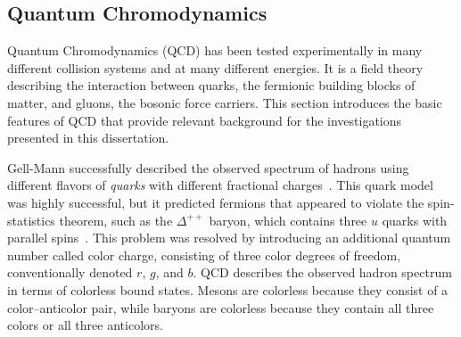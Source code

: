 \subsection{Quantum Chromodynamics}
\label{sec:qcd}


Quantum Chromodynamics (QCD) has been tested experimentally in many different collision systems and at many different energies. It is a field theory describing the interaction between quarks, the fermionic building blocks of matter, and gluons, the bosonic force carriers.
This section introduces the basic features of QCD that provide relevant background for the investigations presented in this dissertation.

Gell-Mann successfully described the observed spectrum of hadrons using different flavors of \textit{quarks} with different fractional charges~\cite{gellmann}.
This quark model was highly successful, but it predicted fermions that appeared to violate the spin-statistics theorem, such as the $\Delta^{++}$ baryon, which contains three $u$ quarks with parallel spins~\cite{psqft}.
This problem was resolved by introducing an additional quantum number called color charge, consisting of three color degrees of freedom, conventionally denoted $r$, $g$, and $b$.
QCD describes the observed hadron spectrum in terms of colorless bound states. Mesons are colorless because they consist of a color--anticolor pair, while baryons are colorless because they contain all three colors or all three anticolors.
\FloatBarrier

